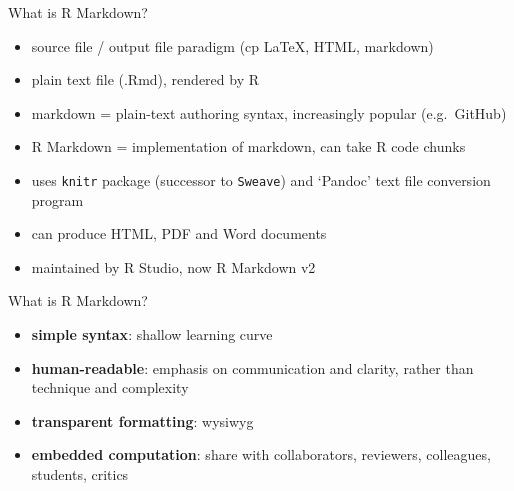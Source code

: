 \begin{frame}{What is R Markdown?}

\begin{itemize}[<+->]
\itemsep1pt\parskip0pt
\item
  source file / output file paradigm (cp LaTeX, HTML, markdown)
\item
  plain text file (.Rmd), rendered by R
\item
  markdown = plain-text authoring syntax, increasingly popular
  (e.g.~GitHub)
\item
  R Markdown = implementation of markdown, can take R code chunks
\item
  uses \texttt{knitr} package (successor to \texttt{Sweave}) and
  `Pandoc' text file conversion program
\item
  can produce HTML, PDF and Word documents
\item
  maintained by R Studio, now R Markdown v2
\end{itemize}

\end{frame}

\begin{frame}{What is R Markdown?}

\begin{itemize}[<+->]
\itemsep1pt\parskip0pt
\item
  \textbf{simple syntax}: shallow learning curve
\item
  \textbf{human-readable}: emphasis on communication and clarity, rather
  than technique and complexity
\item
  \textbf{transparent formatting}: wysiwyg
\item
  \textbf{embedded computation}: share with collaborators, reviewers,
  colleagues, students, critics
\end{itemize}

\end{frame}

